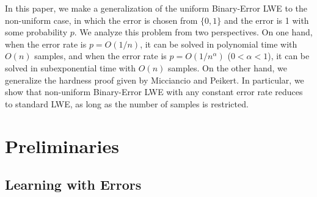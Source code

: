 \documentclass[a4paper]{article}
\theoremstyle{definition}
\theoremstyle{remark}
\renewcommand{\epsilon}{\varepsilon}
\begin{document}
In this paper, we make a generalization of the uniform Binary-Error LWE to the non-uniform case,
in which the error is chosen from $\{0,1\}$ and the error is 1 with some probability $p$.
We analyze this problem from two perspectives. On one hand, when the error rate is $p = O(1/n)$,
it can be solved in polynomial time with $O(n)$ samples, and when the error rate is $p = O(1/n^{\alpha})$ ($0 < \alpha < 1$),
it can be solved in subexponential time with $O(n)$ samples. On the other hand, we generalize the hardness proof 
given by Micciancio and Peikert. In particular, we show that non-uniform Binary-Error LWE with any constant error rate reduces to 
standard LWE, as long as the number of samples is restricted.
\iffalse
Binary-Error LWE with constant is as hard as 

In this paper, we show that a simple extension of the Arora-Ge attack
(based on similar ideas as the Gr\"obner basis approach, but simpler and
at least as fast) provides a smooth time-sample trade-off for
Binary-Error LWE: the attack can tackle any number of samples, with
increasing complexity as the number of samples decreases. In particular,
for Binary-Error LWE with $\epsilon\cdot n^2$ samples ($\epsilon>0$
constant), we obtain an attack in polynomial time $n^{O(1/\epsilon)}$,
assuming standard heuristics on the polynomial system arising from the
Arora-Ge approach. Similarly, for $n^{1+\alpha}$ samples
($\alpha\in(0,1)$ constant), we obtain an attack in subexponential time
$2^{\tilde O(n^{1-\alpha})}$. The precise complexity for any concrete
number of samples is also easy to compute, which makes it possible to
precisely set parameters for cryptographic schemes based on Binary-Error
LWE.
\fi
\section{Preliminaries}

\subsection{Learning with Errors}
\end{document}
